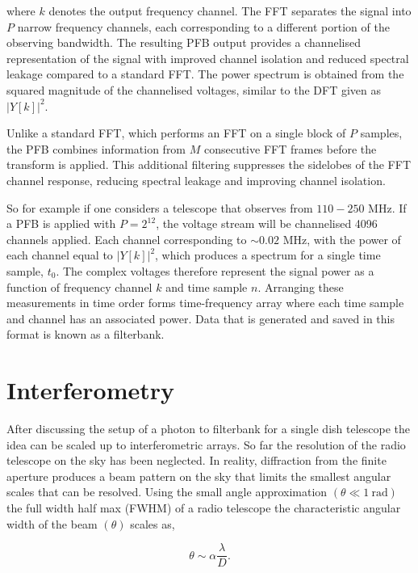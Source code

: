where $k$ denotes the output frequency channel. The FFT separates the signal into $P$ narrow frequency channels, each corresponding to a different portion of the observing bandwidth. The resulting PFB output provides a channelised representation of the signal with improved channel isolation and reduced spectral leakage compared to a standard FFT. The power spectrum is obtained from the squared magnitude of the channelised voltages, similar to the DFT given as $|Y[k]|^2$. 

Unlike a standard FFT, which performs an FFT on a single block of $P$ samples, the PFB combines information from $M$ consecutive FFT frames before the transform is applied. This additional filtering suppresses the sidelobes of the FFT channel response, reducing spectral leakage and improving channel isolation. 

So for example if one considers a telescope that observes from $110-250$ MHz. If a PFB is applied with $P = 2^{12}$, the voltage stream will be channelised 4096 channels applied. Each channel corresponding to $\sim 0.02$ MHz, with the power of each channel equal to $|Y[k]|^2$, which produces a spectrum for a single time sample, $t_0$. The complex voltages therefore represent the signal power as a function of frequency channel $k$ and time sample $n$. Arranging these measurements in time order forms time-frequency array where each time sample and channel has an associated power. Data that is generated and saved in this format is known as a filterbank.


\section{Interferometry}

After discussing the setup of a photon to filterbank for a single dish telescope the idea can be scaled up to interferometric arrays. So far the resolution of the radio telescope on the sky has been neglected. In reality, diffraction from the finite aperture produces a beam pattern on the sky that limits the smallest angular scales that can be resolved.  Using the small angle approximation $(\theta \ll 1 ~ \text{rad})$ the full width half max (FWHM) of a radio telescope the characteristic angular width of the beam $(\theta)$ scales as,

\begin{equation}
    \boxed{
    \theta \sim \alpha \frac{\lambda}{D}. 
    }
\end{equation}

